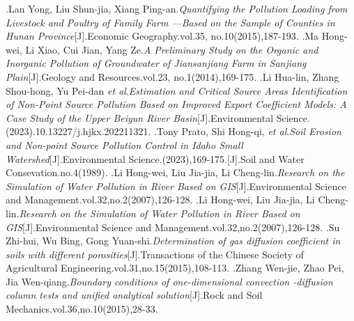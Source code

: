 \documentclass[./main.tex]{subfiles}
\begin{document}
\begin{thebibliography}{99}
        \bibitem.Lan Yong, Liu Shun-jia, Xiang Ping-an.\emph{Quantifying the   Pollution Loading from Livestock and
        Poultry of Family Farm —Based on the Sample of Counties in Hunan Province}[J].Economic Geography.vol.35, no.10(2015),187-193.
        \bibitem.Ma Hong-wei, Li Xiao, Cui Jian, Yang Ze.\emph{A Preliminary Study on the Organic and Inorganic Pollution of Groundwater of Jiansanjiang Farm in Sanjiang Plain}[J].Geology and Resources.vol.23, no.1(2014),169-175.
        \bibitem.Li Hua-lin, Zhang Shou-hong, Yu Pei-dan \textit{et al}.\emph{Estimation and Critical Source Areas
        Identification of Non-Point Source Pollution Based on Improved Export Coefficient Models: A Case Study of the Upper Beiyun River Basin}[J].Environmental Science.(2023).10.13227/j.hjkx.202211321.
        \bibitem.Tony Prato, Shi Hong-qi, \textit{et al}.\emph{Soil Erosion and Non-point Source Pollution Control in Idaho Small Watershed}[J].Environmental Science.(2023),169-175.[J].Soil and Water Consevation.no.4(1989).
        \bibitem.Li Hong-wei, Liu Jia-jia, Li Cheng-lin.\emph{Research on the Simulation of Water Pollution in River Based on GIS}[J].Environmental Science and Management.vol.32,no.2(2007),126-128.
        \bibitem.Li Hong-wei, Liu Jia-jia, Li Cheng-lin.\emph{Research on the Simulation of Water Pollution in River Based on GIS}[J].Environmental Science and Management.vol.32,no.2(2007),126-128.
        \bibitem.Su Zhi-hui, Wu Bing, Gong Yuan-shi.\emph{Determination of gas diffusion coefficient in soils with different porosities}[J].Transactions of the Chinese Society of Agricultural Engineering.vol.31,no.15(2015),108-113.
        \bibitem.Zhang Wen-jie, Zhao Pei, Jia Wen-qiang.\emph{Boundary conditions of one-dimensional convection -diffusion column tests and unified analytical solution}[J].Rock and Soil Mechanics.vol.36,no.10(2015),28-33.
    \end{thebibliography}
\end{document}

